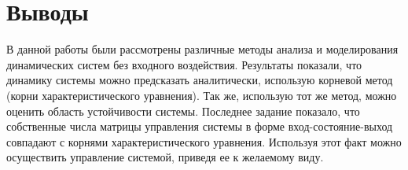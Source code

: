 
\FloatBarrier

\FloatBarrier

\FloatBarrier

\section{Выводы}
В данной работы были рассмотрены различные методы анализа и моделирования динамических систем
без входного воздействия. Результаты показали, что динамику системы можно 
предсказать аналитически, использую корневой метод (корни характеристического уравнения). 
Так же, использую тот же метод, можно оценить область устойчивости системы. 
Последнее задание показало, что собственные числа матрицы управления системы в 
форме вход-состояние-выход совпадают с корнями характеристического уравнения. 
Используя этот факт можно осуществить управление системой, приведя ее к желаемому виду.
